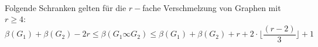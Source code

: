 \begin{lem}$\;\;$\\Folgende Schranken gelten für die $r-$fache Verschmelzung von Graphen mit $r \geq 4$:
$$\beta(G_1)+\beta(G_2)-2r \leq \beta(G_1 \infty G_2) \leq \beta(G_1)+\beta(G_2)+r+2 \cdot \lfloor\frac{(r-2)}{3}\rfloor+1$$
\end{lem}


